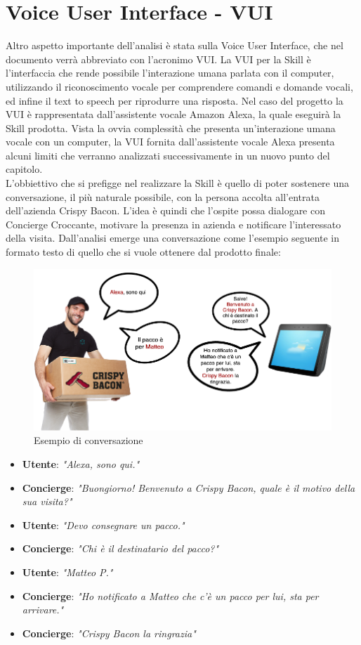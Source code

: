 \section{Voice User Interface - VUI}
Altro aspetto importante dell'analisi è stata sulla Voice User Interface, che nel documento verrà abbreviato con l'acronimo VUI. La VUI per la Skill è l’interfaccia che rende possibile l’interazione umana parlata con il computer, utilizzando il riconoscimento vocale per comprendere comandi e domande vocali, ed infine il text to speech per riprodurre una risposta. Nel caso del progetto la VUI è rappresentata dall'assistente vocale Amazon Alexa, la quale eseguirà la Skill prodotta. Vista la ovvia complessità che presenta un'interazione umana vocale con un computer, la VUI fornita dall'assistente vocale Alexa presenta alcuni limiti che verranno analizzati successivamente in un nuovo punto del capitolo.\\
L’obbiettivo che si prefigge nel realizzare la Skill è quello di poter sostenere una conversazione, il più naturale possibile, con la persona accolta all'entrata dell'azienda Crispy Bacon. L’idea è quindi che l’ospite possa dialogare con Concierge Croccante, motivare la presenza in azienda e notificare l’interessato della visita. Dall'analisi emerge una conversazione come l'esempio seguente in formato testo di quello che si vuole ottenere dal prodotto finale:
\begin{figure}[H] 
    \centering 
    \includegraphics[width=1\columnwidth]{immagini/esempioVUI.png}
    \caption{\label{fig:esempioVUI}Esempio di conversazione}
\end{figure}
\begin{itemize}
	\item \textbf{Utente}: \textit{"Alexa, sono qui."}
	\item \textbf{Concierge}: \textit{ "Buongiorno! Benvenuto a Crispy Bacon, quale è il motivo della sua visita?"}
	\item \textbf{Utente}: \textit{"Devo consegnare un pacco."}
	\item \textbf{Concierge}: \textit{ "Chi è il destinatario del pacco?"}
	\item \textbf{Utente}: \textit{"Matteo P."}
	\item \textbf{Concierge}: \textit{ "Ho notificato a Matteo che c'è un pacco per lui, sta per arrivare."}
	\item \textbf{Concierge}: \textit{ "Crispy Bacon la ringrazia"}
\end{itemize}

